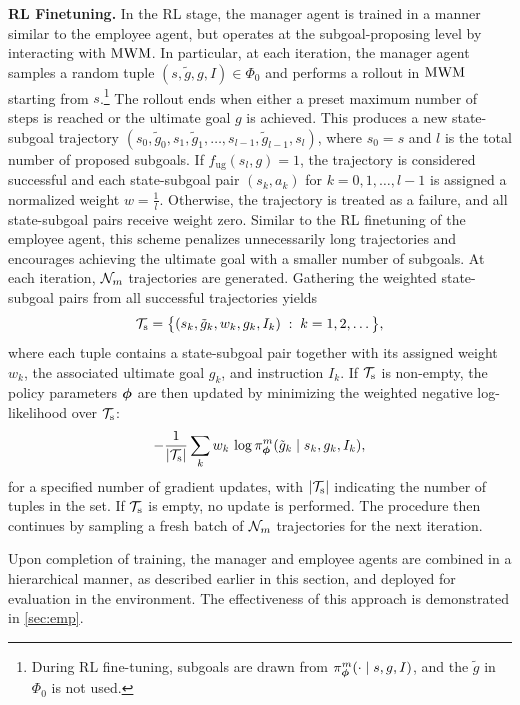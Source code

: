 \textbf{RL Finetuning.} 
In the RL stage, the manager agent is trained in a manner similar to the employee agent, but operates at the subgoal-proposing level by interacting with $\text{MWM}$. In particular, at each iteration, the manager agent samples a random tuple $(s,\tilde g, g, I) \in \Phi_0$ and performs a rollout in $\text{MWM}$ starting from $s$.\footnote{During RL fine-tuning, subgoals are drawn from $\pi^m_{\boldsymbol \phi}(\cdot \mid s, g, I)$, and the $\tilde g$ in $\Phi_0$ is not used.} The rollout ends when either a preset maximum number of steps is reached or the ultimate goal $g$ is achieved. This produces a new state-subgoal trajectory $(s_0, \tilde g_0, s_1, \tilde g_1, \ldots, s_{l-1}, \tilde g_{l-1}, s_l)$, where $s_0 = s$ and $l$ is the total number of proposed subgoals. If $f_{\mathrm{ug}}(s_l, g) = 1$, the trajectory is considered successful and each state-subgoal pair $(s_k, a_k)$ for $k = 0,1,\ldots,l-1$ is assigned a normalized weight $w = \frac{1}{l}$. Otherwise, the trajectory is treated as a failure, and all state-subgoal pairs receive weight zero.  Similar to the RL finetuning of the employee agent, this scheme penalizes unnecessarily long trajectories and encourages achieving the ultimate goal with a smaller number of subgoals. At each iteration, $\mathcal{N}_m$ trajectories are generated. Gathering the weighted state-subgoal pairs from all successful trajectories yields
\[
\mathcal{T}_{\mathrm{s}}
= \big\{ (s_k, \tilde{g}_k, w_k, g_k, I_k) \;:\; k=1,2, \ldots  \big\},
\]
where each tuple contains a state-subgoal pair together with its assigned weight \(w_k\), the associated ultimate goal \(g_k\), and instruction \(I_k\). If $\mathcal{T}_\mathrm{s}$ is non-empty, the policy parameters $\boldsymbol \phi$ are then updated by minimizing the weighted negative log-likelihood over $\mathcal{T}_{\mathrm{s}}$:
\begin{equation}
-  \frac{1}{|\mathcal{T}_{\mathrm{s}}|}\sum_k
w_{k} \, \log \pi^m_{\boldsymbol \phi}(\tilde g_k \mid s_k, g_k, I_k),
\end{equation}
for a specified number of gradient updates, with $|\mathcal{T}_{\mathrm{s}}|$ indicating the number of tuples in the set. If $\mathcal{T}_{\mathrm{s}}$ is empty, no update is performed. The procedure then continues by sampling a fresh batch of $\mathcal{N}_m$ trajectories for the next iteration.


Upon completion of training, the manager and employee agents are combined in a hierarchical manner, as described earlier in this section, and deployed for evaluation in the environment. The effectiveness of this approach is demonstrated in \cref{sec:emp}.